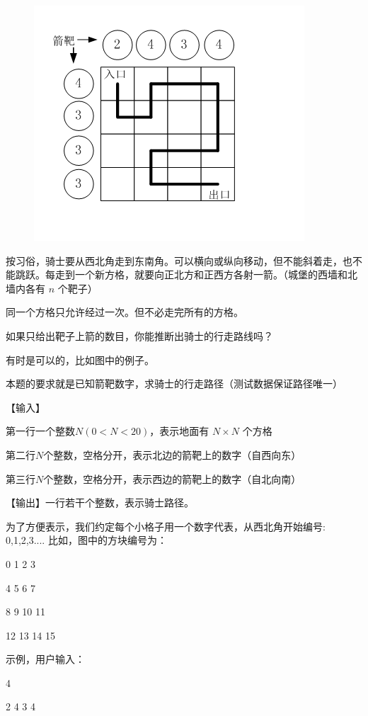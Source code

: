\documentclass[a4paper, 12pt, twocolumn]{ctexart}
\begin{document}
	\begin{figure}[H]
		\centering
		\includegraphics[width=0.8\linewidth]{002.png}
	\end{figure}
	
	按习俗，骑士要从西北角走到东南角。可以横向或纵向移动，但不能斜着走，也不能跳跃。每走到一个新方格，就要向正北方和正西方各射一箭。（城堡的西墙和北墙内各有 $n$ 个靶子）
	
	同一个方格只允许经过一次。但不必走完所有的方格。
	
	如果只给出靶子上箭的数目，你能推断出骑士的行走路线吗？
	
	有时是可以的，比如图中的例子。
	
	本题的要求就是已知箭靶数字，求骑士的行走路径（测试数据保证路径唯一）
	
	【输入】
	
	第一行一个整数$N(0<N<20)$，表示地面有 $N\times N$ 个方格
	
	第二行$N$个整数，空格分开，表示北边的箭靶上的数字（自西向东）
	
	第三行$N$个整数，空格分开，表示西边的箭靶上的数字（自北向南）
	
	【输出】一行若干个整数，表示骑士路径。
	
	为了方便表示，我们约定每个小格子用一个数字代表，从西北角开始编号: 0,1,2,3....
	比如，图中的方块编号为：
	
	0  1  2  3
	
	4  5  6  7
	
	8  9  10 11
	
	12 13 14 15
	
	示例，用户输入：
	
	4
	
	2 4 3 4
	
\end{document}
